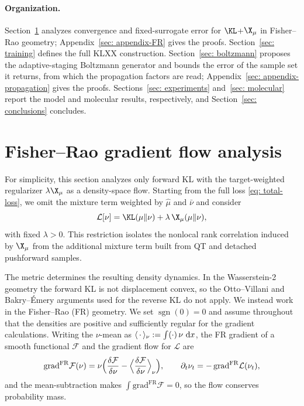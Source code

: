 \documentclass{article}
\begin{document}
\paragraph{Organization.}
Section~\ref{sec: FR} analyzes convergence and fixed-surrogate error for $\KL$+$\X_\mu$ in Fisher--Rao geometry; Appendix~\ref{sec: appendix-FR} gives the proofs. Section~\ref{sec: training} defines the full KLXX construction. Section~\ref{sec: boltzmann} proposes the adaptive-staging Boltzmann generator and bounds the error of the sample set it returns, from which the propagation factors are read; Appendix~\ref{sec: appendix-propagation} gives the proofs. Sections~\ref{sec: experiments} and~\ref{sec: molecular} report the model and molecular results, respectively, and Section~\ref{sec: conclusions} concludes.


\section{Fisher--Rao gradient flow analysis}
\label{sec: FR}

For simplicity, this section analyzes only forward KL with the target-weighted regularizer $\lambda\X_\mu$ as a density-space flow. Starting from the full loss \eqref{eq: total-loss}, we omit the mixture term weighted by $\hat\mu$ and $\bar\nu$ and consider
\begin{equation}
    \mathcal L[\nu] = \KL(\mu\|\nu) + \lambda\,\X_\mu(\mu\|\nu),
    \label{eq: loss KL X}
\end{equation}
with fixed $\lambda > 0$. This restriction isolates the nonlocal rank correlation induced by $\X_\mu$ from the additional mixture term built from QT and detached pushforward samples.

The metric determines the resulting density dynamics. In the Wasserstein-2 geometry the forward KL is not displacement convex, so the Otto--Villani \citep{otto2000generalization} and Bakry--{\'E}mery \citep{bakry2014analysis} arguments used for the reverse KL do not apply. We instead work in the Fisher--Rao (FR) geometry. We set $\operatorname{sgn}(0)=0$ and assume throughout that the densities are positive and sufficiently regular for the gradient calculations. Writing the $\nu$-mean as $\langle\,\cdot\,\rangle_\nu := \int (\cdot)\,\nu\,\,\mathrm d x$, the FR gradient of a smooth functional $\mathcal F$ and the gradient flow for $\mathcal L$ are
\begin{equation}
    \mathrm{grad}^{\mathrm{FR}}\mathcal F(\nu) = \nu\Bigl(\frac{\delta\mathcal F}{\delta\nu} - \Bigl\langle\frac{\delta\mathcal F}{\delta\nu}\Bigr\rangle_\nu\Bigr),
    \qquad
    \partial_t\nu_t = -\,\mathrm{grad}^{\mathrm{FR}}\mathcal L(\nu_t),
    \label{eq: FR-gradient}
\end{equation}
and the mean-subtraction makes $\int \mathrm{grad}^{\mathrm{FR}}\mathcal F = 0$, so the flow conserves probability mass.
\end{document}
